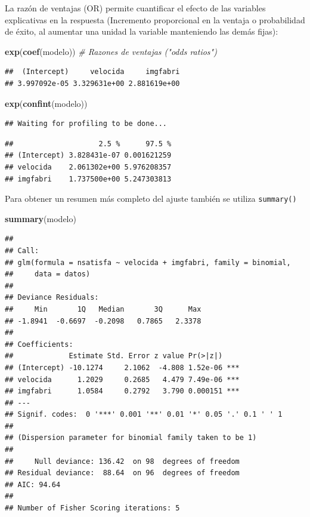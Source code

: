 \documentclass[]{book}
\newenvironment{Shaded}{\begin{snugshade}}{\end{snugshade}}
\newcommand{\CommentTok}[1]{\textcolor[rgb]{0.56,0.35,0.01}{\textit{#1}}}
\newcommand{\KeywordTok}[1]{\textcolor[rgb]{0.13,0.29,0.53}{\textbf{#1}}}
\newcommand{\NormalTok}[1]{#1}
\begin{document}
La razón de ventajas (OR) permite cuantificar el efecto de las variables explicativas en la respuesta
(Incremento proporcional en la ventaja o probabilidad de éxito, al aumentar una unidad la variable manteniendo las demás fijas):

\begin{Shaded}
\begin{Highlighting}[]
\KeywordTok{exp}\NormalTok{(}\KeywordTok{coef}\NormalTok{(modelo))  }\CommentTok{# Razones de ventajas ("odds ratios")}
\end{Highlighting}
\end{Shaded}

\begin{verbatim}
##  (Intercept)     velocida     imgfabri 
## 3.997092e-05 3.329631e+00 2.881619e+00
\end{verbatim}

\begin{Shaded}
\begin{Highlighting}[]
\KeywordTok{exp}\NormalTok{(}\KeywordTok{confint}\NormalTok{(modelo))}
\end{Highlighting}
\end{Shaded}

\begin{verbatim}
## Waiting for profiling to be done...
\end{verbatim}

\begin{verbatim}
##                    2.5 %      97.5 %
## (Intercept) 3.828431e-07 0.001621259
## velocida    2.061302e+00 5.976208357
## imgfabri    1.737500e+00 5.247303813
\end{verbatim}

Para obtener un resumen más completo del ajuste también se utiliza \texttt{summary()}

\begin{Shaded}
\begin{Highlighting}[]
\KeywordTok{summary}\NormalTok{(modelo)}
\end{Highlighting}
\end{Shaded}

\begin{verbatim}
## 
## Call:
## glm(formula = nsatisfa ~ velocida + imgfabri, family = binomial, 
##     data = datos)
## 
## Deviance Residuals: 
##     Min       1Q   Median       3Q      Max  
## -1.8941  -0.6697  -0.2098   0.7865   2.3378  
## 
## Coefficients:
##             Estimate Std. Error z value Pr(>|z|)    
## (Intercept) -10.1274     2.1062  -4.808 1.52e-06 ***
## velocida      1.2029     0.2685   4.479 7.49e-06 ***
## imgfabri      1.0584     0.2792   3.790 0.000151 ***
## ---
## Signif. codes:  0 '***' 0.001 '**' 0.01 '*' 0.05 '.' 0.1 ' ' 1
## 
## (Dispersion parameter for binomial family taken to be 1)
## 
##     Null deviance: 136.42  on 98  degrees of freedom
## Residual deviance:  88.64  on 96  degrees of freedom
## AIC: 94.64
## 
## Number of Fisher Scoring iterations: 5
\end{verbatim}
\end{document}
